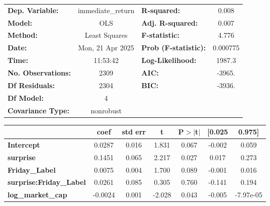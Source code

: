 \begin{center}
\begin{tabular}{lclc}
\toprule
\textbf{Dep. Variable:}         & immediate\_return & \textbf{  R-squared:         } &     0.008   \\
\textbf{Model:}                 &        OLS        & \textbf{  Adj. R-squared:    } &     0.007   \\
\textbf{Method:}                &   Least Squares   & \textbf{  F-statistic:       } &     4.776   \\
\textbf{Date:}                  &  Mon, 21 Apr 2025 & \textbf{  Prob (F-statistic):} &  0.000775   \\
\textbf{Time:}                  &      11:53:42     & \textbf{  Log-Likelihood:    } &    1987.3   \\
\textbf{No. Observations:}      &         2309      & \textbf{  AIC:               } &    -3965.   \\
\textbf{Df Residuals:}          &         2304      & \textbf{  BIC:               } &    -3936.   \\
\textbf{Df Model:}              &            4      & \textbf{                     } &             \\
\textbf{Covariance Type:}       &     nonrobust     & \textbf{                     } &             \\
\bottomrule
\end{tabular}
\begin{tabular}{lcccccc}
                                & \textbf{coef} & \textbf{std err} & \textbf{t} & \textbf{P$> |$t$|$} & \textbf{[0.025} & \textbf{0.975]}  \\
\midrule
\textbf{Intercept}              &       0.0287  &        0.016     &     1.831  &         0.067        &       -0.002    &        0.059     \\
\textbf{surprise}               &       0.1451  &        0.065     &     2.217  &         0.027        &        0.017    &        0.273     \\
\textbf{Friday\_Label}          &       0.0075  &        0.004     &     1.700  &         0.089        &       -0.001    &        0.016     \\
\textbf{surprise:Friday\_Label} &       0.0261  &        0.085     &     0.305  &         0.760        &       -0.141    &        0.194     \\
\textbf{log\_market\_cap}       &      -0.0024  &        0.001     &    -2.028  &         0.043        &       -0.005    &    -7.97e-05     \\

\end{tabular}
\end{center}
